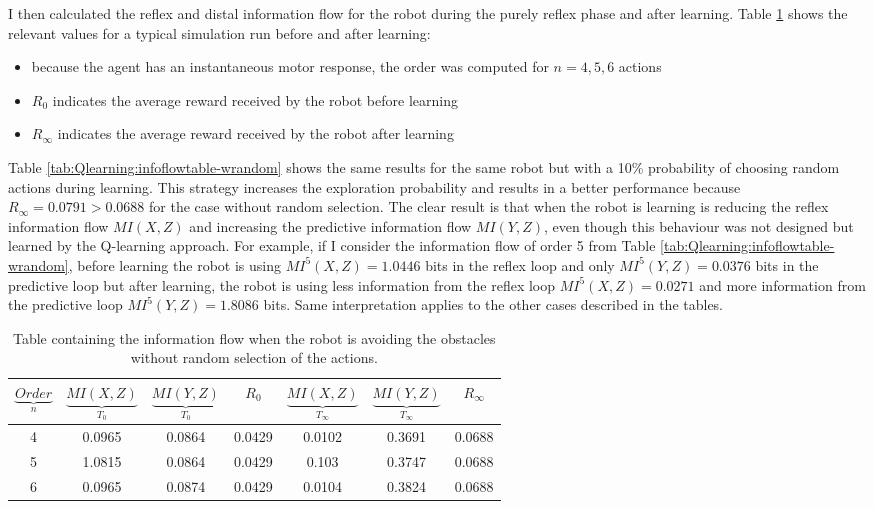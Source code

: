 I then calculated the reflex and distal information flow for the robot during the purely reflex phase and after learning.
Table \ref{tab:Qlearning:infoflowtable-worandom} shows the relevant values
for a typical simulation run before and after learning:
\begin{itemize}
 \item because the agent has an instantaneous motor response, the order was computed
for $n=4,5,6$ actions
\item $R_0$ indicates the average reward received by the robot before learning
\item $R_\infty$ indicates the average reward received by the robot after learning
\end{itemize}
Table \ref{tab:Qlearning:infoflowtable-wrandom} shows the same results for the
same robot but with a 10\% probability of choosing random actions during learning.
This strategy increases the exploration probability and results in a better
performance because $R_\infty=0.0791>0.0688$ for the case without random selection.
The clear result is that when the robot is learning is reducing the reflex information
flow $MI(X,Z)$ and increasing the predictive information flow $MI(Y,Z)$,
even though this behaviour was not designed but learned by the Q-learning approach.
For example, if I consider the information flow of order 5 from Table \ref{tab:Qlearning:infoflowtable-wrandom},
before learning the robot is using $MI^{5}(X,Z)=1.0446$ bits in the reflex loop
and only $MI^{5}(Y,Z)=0.0376 $ bits in the predictive loop but after learning,
the robot is using less information from the reflex loop $MI^{5}(X,Z)=0.0271$ and
more information from the predictive loop $MI^{5}(Y,Z)=1.8086 $ bits.
Same interpretation applies to the other cases described in the tables.

\begin{table}[htbp]
\addtolength{\tabcolsep}{-2pt}
\centering
\begin{tabular}{| c|| c| c | c| c | c | c |}
\hline
$\underbrace{Order}_ n$& $\underbrace{MI(X,Z)}_{T_0}$& $\underbrace{MI(Y,Z)}_{T_0}$ & $R_0$ & $\underbrace{MI(X,Z)}_{T_\infty}$& $\underbrace{MI(Y,Z)}_{T_\infty}$ & $R_\infty$ \\
\hline
4 & 0.0965 & 0.0864 & 0.0429 & 0.0102 & 0.3691 & 0.0688 \\
\hline
5 & 1.0815 & 0.0864 & 0.0429 & 0.103 & 0.3747 & 0.0688 \\
\hline
6 & 0.0965 & 0.0874 & 0.0429 & 0.0104 & 0.3824 & 0.0688 \\
\hline
\end{tabular}
\caption[Information flow for avoidance robot]{Table containing the information flow when
the robot is avoiding the obstacles without random selection of the actions. \label{tab:Qlearning:infoflowtable-worandom}}

\end{table}


